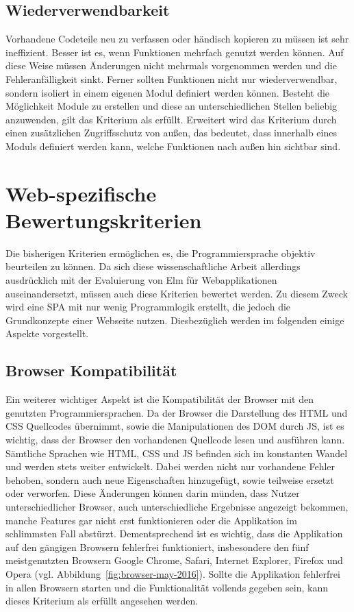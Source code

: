 \subsection{Wiederverwendbarkeit}
\label{sec:muster_wiederverwendbarkeit}
Vorhandene Codeteile neu zu verfassen oder händisch kopieren zu müssen ist sehr ineffizient. Besser ist es, wenn Funktionen mehrfach genutzt werden können. Auf diese Weise müssen Änderungen nicht mehrmals vorgenommen werden und die Fehleranfälligkeit sinkt. Ferner sollten Funktionen nicht nur wiederverwendbar, sondern isoliert in einem eigenen Modul definiert werden können. Besteht die Möglichkeit Module zu erstellen und diese an unterschiedlichen Stellen beliebig anzuwenden, gilt das Kriterium als erfüllt. Erweitert wird das Kriterium durch einen zusätzlichen Zugriffsschutz von außen, das bedeutet, dass innerhalb eines Moduls definiert werden kann, welche Funktionen nach außen hin sichtbar sind.


\section{Web-spezifische Bewertungskriterien}
\label{sec:muster_web}
Die bisherigen Kriterien ermöglichen es, die Programmiersprache objektiv beurteilen zu können. Da sich diese wissenschaftliche Arbeit allerdings ausdrücklich mit der Evaluierung von Elm für Webapplikationen auseinandersetzt, müssen auch diese Kriterien bewertet werden.
Zu diesem Zweck wird eine \ac{SPA} mit nur wenig Programmlogik erstellt, die jedoch die Grundkonzepte einer Webseite nutzen. Diesbezüglich werden im folgenden einige Aspekte vorgestellt.

\subsection{Browser Kompatibilität}
\label{sec:muster_browser_kompatibilitaet}
Ein weiterer wichtiger Aspekt ist die Kompatibilität der Browser mit den genutzten Programmiersprachen. Da der Browser die Darstellung des \ac{HTML} und \ac{CSS} Quellcodes übernimmt, sowie die Manipulationen des DOM durch \ac{JS}, ist es wichtig, dass der Browser den vorhandenen Quellcode lesen und ausführen kann. Sämtliche Sprachen wie \ac{HTML}, \ac{CSS} und \ac{JS} befinden sich im konstanten Wandel und werden stets weiter entwickelt.
Dabei werden nicht nur vorhandene Fehler behoben, sondern auch neue Eigenschaften hinzugefügt, sowie teilweise ersetzt oder verworfen. Diese Änderungen können darin münden, dass Nutzer unterschiedlicher Browser, auch unterschiedliche Ergebnisse angezeigt bekommen, manche Features gar nicht erst funktionieren oder die Applikation im schlimmsten Fall abstürzt. Dementsprechend ist es wichtig, dass die Applikation auf den gängigen Browsern fehlerfrei funktioniert, insbesondere den fünf meistgenutzten Browsern Google Chrome, Safari, Internet Explorer, Firefox und Opera (vgl. Abbildung~\ref{fig:browser-may-2016}). Sollte die Applikation fehlerfrei in allen Browsern starten und die Funktionalität vollends gegeben sein, kann dieses Kriterium als erfüllt angesehen werden.


